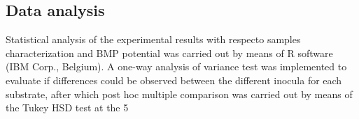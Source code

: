 \subsection{Data analysis}

Statistical analysis of the experimental results with respecto samples characterization and BMP potential was carried out by means of R software (IBM Corp., Belgium). A one-way analysis of variance test was implemented to evaluate if differences could be observed between the different inocula for each substrate, after which post hoc multiple comparison was carried out by means of the Tukey HSD test at the 5%

